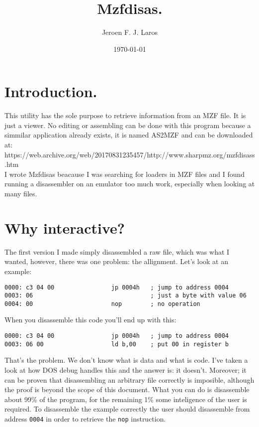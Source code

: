 \documentclass{article}
\title{\Huge Mzfdisas.}
\author{Jeroen F. J. Laros}
\date{\today}
\begin{document}
\maketitle
\newpage

\tableofcontents
\newpage

\section{Introduction.}
This utility has the sole purpose to retrieve information from an MZF file. It
is just a viewer. No editing or assembling can be done with this program 
because a simmilar application already exists, it is named AS2MZF and can be
downloaded at: https://web.archive.org/web/20170831235457/http://www.sharpmz.org/mzfdisass.htm \\
I wrote Mzfdisas beacause I was searching for loaders in MZF files and I found
running a disassembler on an emulator too much work, especially when looking
at many files.

\section{Why interactive?}
The first version I made simply disassembled a raw file, which was what I 
wanted, however, there was one problem: the allignment. Let's look at an
example: \begin{verbatim} 
0000: c3 04 00                jp 0004h   ; jump to address 0004
0003: 06                                 ; just a byte with value 06
0004: 00                      nop        ; no operation
\end{verbatim} When you disassemble this code you'll end up with this:
\begin{verbatim} 
0000: c3 04 00                jp 0004h   ; jump to address 0004
0003: 06 00                   ld b,00    ; put 00 in register b
\end{verbatim} That's the problem. We don't know what is data and what is code.
I've taken a look at how DOS debug handles this and the answer is: it doesn't.
Moreover; it can be proven that disassembling an arbitrary file correctly is 
imposible, although the proof is beyond the scope of this document. What you 
can do is disassemble about 99\% of the program, for the remaining 1\% some 
inteligence of the user is required. To disassemble the example correctly the
user should disassemble from address \verb+0004+ in order to retrieve the 
\verb+nop+ instruction.
\end{document}
